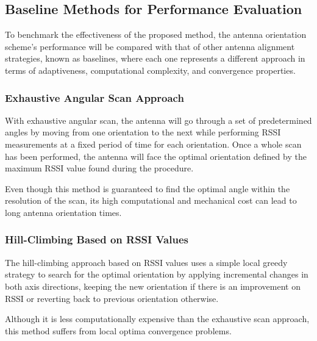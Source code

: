 \subsection{Baseline Methods for Performance Evaluation}

To benchmark the effectiveness of the proposed method, the antenna orientation scheme's performance will be compared with that of other antenna alignment strategies, known as baselines, where each one represents a different approach in terms of adaptiveness, computational complexity, and convergence properties.

\subsubsection{Exhaustive Angular Scan Approach}

With exhaustive angular scan, the antenna will go through a set of predetermined angles by moving from one orientation to the next while performing RSSI measurements at a fixed period of time for each orientation. Once a whole scan has been performed, the antenna will face the optimal orientation defined by the maximum RSSI value found during the procedure.

Even though this method is guaranteed to find the optimal angle within the resolution of the scan, its high computational and mechanical cost can lead to long antenna orientation times.

\subsubsection{Hill-Climbing Based on RSSI Values}

The hill-climbing approach based on RSSI values uses a simple local greedy strategy to search for the optimal orientation by applying incremental changes in both axis directions, keeping the new orientation if there is an improvement on RSSI or reverting back to previous orientation otherwise.

Although it is less computationally expensive than the exhaustive scan approach, this method suffers from local optima convergence problems.